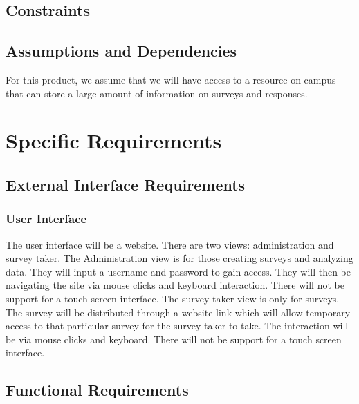 \documentclass[letterpaper,10pt,titlepage, draftclsnofoot,onecolumn]{IEEEtran}
\begin{document}
\subsection{Constraints}
\subsection{Assumptions and Dependencies}
For this product, we assume that we will have access to a resource on campus that can store a large amount of information on
surveys and responses. %
\section{Specific Requirements}
\subsection{External Interface Requirements}
\subsubsection{User Interface}
The user interface will be a website. There are two views: administration and survey taker. 
The Administration view is for those creating surveys and analyzing data. They will input a 
username and password to gain access. They will then be navigating the site via mouse clicks 
and keyboard interaction. There will not be support for a touch screen interface. The survey
taker view is only for surveys. The survey will be distributed through a website link which 
will allow temporary access to that particular survey for the survey taker to take. The 
interaction will be via mouse clicks and keyboard. There will not be support for a touch screen
interface.

\subsection{Functional Requirements}
\end{document}
